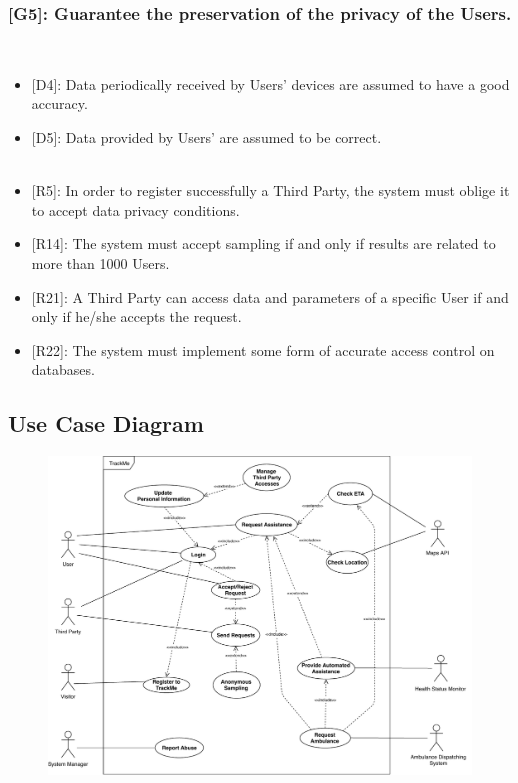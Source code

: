 \documentclass[12pt,a4paper]{article}
\begin{document}
	\subsubsection*{{[}{G5}{]}: Guarantee the preservation of the privacy of the Users.}
	\begin{itemize}\\
		\begin{itemize}
			\item {[D4]}: Data periodically received by Users' devices are assumed to have a good accuracy. 
			\item {[D5]}: Data provided by Users' are assumed to be correct. 
			\\ \\
			\item {[R5]}: In order to register successfully a Third Party, the system must oblige it to accept data privacy conditions.
			\item {[R14]}: The system must accept sampling if and only if results are related to more than 1000 Users.
			\item {[R21]}: A Third Party can access data and parameters of a specific User if and only if he/she accepts the request.
			\item {[R22]}: The system must implement some form of accurate access control on databases.
		\end{itemize}
	\end{itemize}
	
	\newpage
	\subsection{Use Case Diagram}
	\begin{figure}[h]
		\centering
		\includegraphics[width=1.25\linewidth]{Images/use_case_diagram}
		\label{fig:use_case_diagram}
	\end{figure}
	
\end{document}

